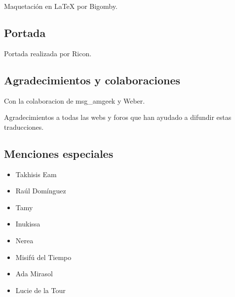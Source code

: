 \begin{multicols}{2}
Maquetación en LaTeX por Bigomby.

\subsection*{Portada}\label{portada}

Portada realizada por Ricon.

\subsection*{Agradecimientos y
colaboraciones}\label{agradecimientos-y-colaboraciones}

Con la colaboracion de msg\_amgeek y Weber.

Agradecimientos a todas las webs y foros que han ayudado a difundir
estas traducciones.

\subsection*{Menciones especiales}\label{menciones-especiales}

\begin{itemize}
\itemsep1pt\parskip0pt
\item
  Takhisis Eam
\item
  Raúl Domínguez
\item
  Tamy
\item
  Inukissa
\item
  Nerea
\item
  Misifú del Tiempo
\item
  Ada Mirasol
\item
  Lucie de la Tour
\end{itemize}

\end{multicols}
\endgroup